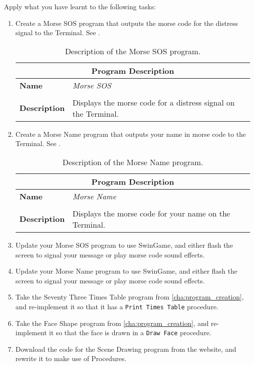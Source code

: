 Apply what you have learnt to the following tasks:
\begin{enumerate}
  \item Create a Morse SOS program that outputs the morse code for the distress signal to the Terminal. See .
  
  \begin{table}[h]
  \centering
  \begin{tabular}{l|p{10cm}}
    \hline
    \multicolumn{2}{c}{\textbf{Program Description}} \\
    \hline
    \textbf{Name} & \emph{Morse SOS} \\
    \\
    \textbf{Description} & Displays the morse code for a distress signal on the Terminal. \\
    \hline
  \end{tabular}
  \caption{Description of the Morse SOS program.}
  \label{tbl:procedure-decl-morse_sos}
  \end{table}
  
  \item Create a Morse Name program that outputs your name in morse code to the Terminal. See .
  
  \begin{table}[h]
  \centering
  \begin{tabular}{l|p{10cm}}
    \hline
    \multicolumn{2}{c}{\textbf{Program Description}} \\
    \hline
    \textbf{Name} & \emph{Morse Name} \\
    \\
    \textbf{Description} & Displays the morse code for your name on the Terminal. \\
    \hline
  \end{tabular}
  \caption{Description of the Morse Name program.}
  \label{tbl:procedure-decl-morse_name}
  \end{table}
  
  \item Update your Morse SOS program to use SwinGame, and either flash the screen to signal your message or play morse code sound effects.
  \item Update your Morse Name program to use SwinGame, and either flash the screen to signal your message or play morse code sound effects.
  
  \item Take the Seventy Three Times Table program from \cref{cha:program_creation}, and re-implement it so that it has a \texttt{Print Times Table} procedure.
  \item Take the Face Shape program from \cref{cha:program_creation}, and re-implement it so that the face is drawn in a \texttt{Draw Face} procedure.
  \item Download the code for the Scene Drawing program from the website, and rewrite it to make use of Procedures.
\end{enumerate}

